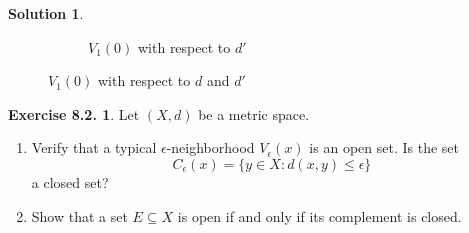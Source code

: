 \documentclass[12pt]{article}
\theoremstyle{definition}
\theoremstyle{exercise}
\newtheorem{exercise}{Exercise 8.2.}
\theoremstyle{solution}
\newtheorem*{solution}{Solution}
\begin{document}
\begin{solution}
\begin{figure}[H]
\begin{subfigure}{0.47\textwidth}
            \caption{\( V_1(0) \) with respect to \( d' \)}
            \label{fig:2sub2}
        \end{subfigure}
        \caption{\( V_1(0) \) with respect to \( d \) and \( d' \)}
        \label{fig:2}
    \end{figure}
\end{solution}

\begin{exercise}
\label{ex:8}
    Let \( (X, d) \) be a metric space.
    \begin{enumerate}
        \item Verify that a typical \( \epsilon \)-neighborhood \( V_{\epsilon}(x) \) is an open set. Is the set
        \[
            C_{\epsilon}(x) = \{ y \in X : d(x, y) \leq \epsilon \}
        \]
        a closed set?

        \item Show that a set \( E \subseteq X \) is open if and only if its complement is closed.
    \end{enumerate}
\end{exercise}
\end{document}
